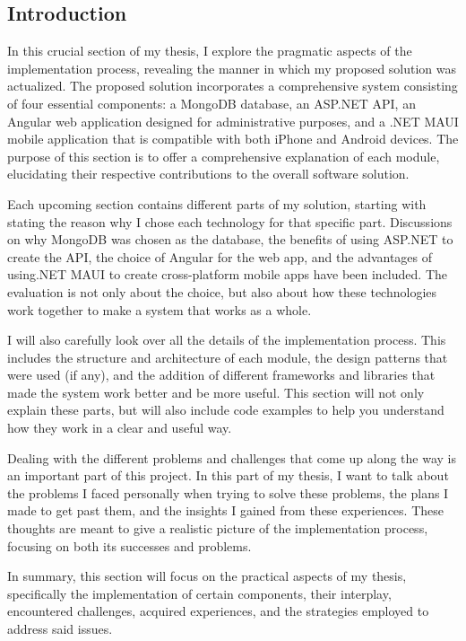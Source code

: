 \subsection{Introduction}

In this crucial section of my thesis, I explore the pragmatic aspects of the implementation process, revealing the manner in which my proposed solution was actualized. The proposed solution incorporates a comprehensive system consisting of four essential components: a MongoDB database, an ASP.NET API, an Angular web application designed for administrative purposes, and a .NET MAUI mobile application that is compatible with both iPhone and Android devices. The purpose of this section is to offer a comprehensive explanation of each module, elucidating their respective contributions to the overall software solution.

Each upcoming section contains different parts of my solution, starting with stating the reason why I chose each technology for that specific part. Discussions on why MongoDB was chosen as the database, the benefits of using ASP.NET to create the API, the choice of Angular for the web app, and the advantages of using.NET MAUI to create cross-platform mobile apps have been included. The evaluation is not only about the choice, but also about how these technologies work together to make a system that works as a whole.

I will also carefully look over all the details of the implementation process. This includes the structure and architecture of each module, the design patterns that were used (if any), and the addition of different frameworks and libraries that made the system work better and be more useful. This section will not only explain these parts, but will also include code examples to help you understand how they work in a clear and useful way.

Dealing with the different problems and challenges that come up along the way is an important part of this project. In this part of my thesis, I want to talk about the problems I faced personally when trying to solve these problems, the plans I made to get past them, and the insights I gained from these experiences. These thoughts are meant to give a realistic picture of the implementation process, focusing on both its successes and problems.

In summary, this section will focus on the practical aspects of my thesis, specifically the implementation of certain components, their interplay, encountered challenges, acquired experiences, and the strategies employed to address said issues.

